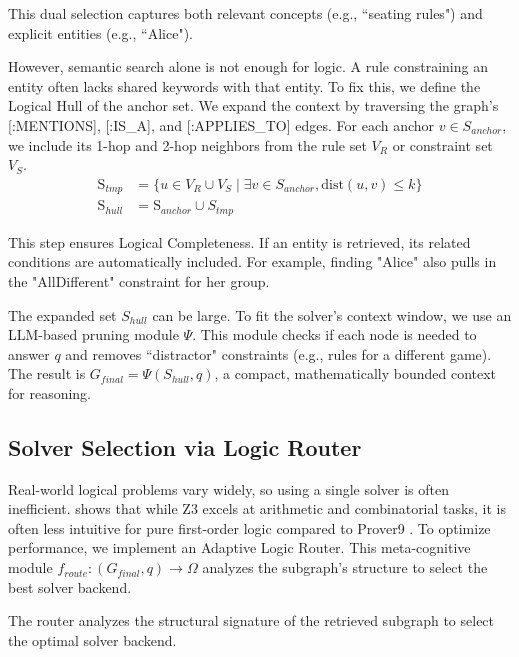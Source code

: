 \documentclass{article}
\theoremstyle{plain}
\theoremstyle{definition}
\theoremstyle{remark}
\begin{document}
This dual selection captures both relevant concepts (e.g., ``seating rules") and explicit entities (e.g., ``Alice").

However, semantic search alone is not enough for logic. A rule constraining an entity often lacks shared keywords with that entity. To fix this, we define the Logical Hull of the anchor set. We expand the context by traversing the graph's [:MENTIONS], [:IS\_A], and [:APPLIES\_TO] edges. For each anchor $v \in S_{anchor}$, we include its 1-hop and 2-hop neighbors from the rule set $V_R$ or constraint set $V_S$.
\begin{equation}
\begin{split}
    \text{S}_{tmp} &= \{ u \in V_R \cup V_S \mid \exists v \in S_{anchor}, \text{dist}(u, v) \le k \} \\
    \text{S}_{hull} &= \text{S}_{anchor} \cup S_{tmp}
\end{split}
\end{equation}

This step ensures Logical Completeness. If an entity is retrieved, its related conditions are automatically included. For example, finding "Alice" also pulls in the "AllDifferent" constraint for her group.

The expanded set $S_{hull}$ can be large. To fit the solver's context window, we use an LLM-based pruning module $\Psi$. This module checks if each node is needed to answer $q$ and removes ``distractor" constraints (e.g., rules for a different game). The result is $G_{final} = \Psi(S_{hull}, q)$, a compact, mathematically bounded context for reasoning.

\subsection{Solver Selection via Logic Router}

Real-world logical problems vary widely, so using a single solver is often inefficient. \cite{Lam2024closer} shows that while Z3 \cite{demoura2008z3} excels at arithmetic and combinatorial tasks, it is often less intuitive for pure first-order logic compared to Prover9 \cite{mccune2005release}. To optimize performance, we implement an Adaptive Logic Router. This meta-cognitive module $f_{route}: (G_{final}, q) \rightarrow \Omega$ analyzes the subgraph's structure to select the best solver backend.


The router analyzes the structural signature of the retrieved subgraph to select the optimal solver backend.
\end{document}
